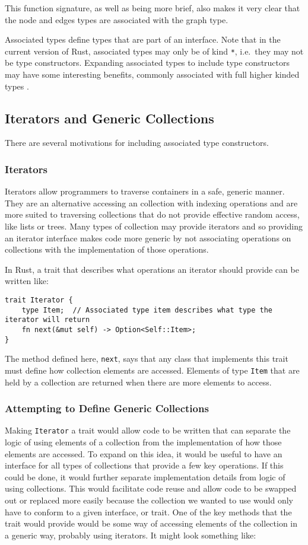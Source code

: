 This function signature, as well as being more brief, also makes it very clear
that the node and edges types are associated with the graph type. 

Associated types define types that are part of an interface. Note that in the
current version of Rust, associated types may only be of kind \lstinline{*},
i.e.\ they may not be type constructors. Expanding associated types to include
type constructors may have some interesting benefits, commonly associated with
full higher kinded types \cite{niko}.

\subsection{Iterators and Generic Collections}
There are several motivations for including associated type constructors.

\subsubsection{Iterators}
Iterators allow programmers to traverse containers in a safe, generic manner.
They are an alternative accessing an collection with indexing operations and
are more suited to traversing collections that do not provide effective random
access, like lists or trees. Many types of collection may provide iterators and
so providing an iterator interface makes code more generic by not associating
operations on collections with the implementation of those operations.

In Rust, a trait that describes what operations an iterator should provide can
be written like:

\begin{lstlisting}[nolol]
trait Iterator {
    type Item;  // Associated type item describes what type the iterator will return
    fn next(&mut self) -> Option<Self::Item>;
}
\end{lstlisting}

The method defined here, \lstinline{next}, says that any class that implements
this trait must define how collection elements are accessed. Elements of type
\lstinline{Item} that are held by a collection are returned when there are more
elements to access. 

\subsubsection{Attempting to Define Generic Collections}
Making \lstinline{Iterator} a trait would allow code to be written that can
separate the logic of using elements of a collection from the implementation of
how those elements are accessed. To expand on this idea, it would be useful to
have an interface for all types of collections that provide a few key
operations. If this could be done, it would further separate implementation
details from logic of using collections. This would facilitate code reuse and
allow code to be swapped out or replaced more easily because the collection we
wanted to use would only have to conform to a given interface, or trait.  One
of the key methods that the trait would provide would be some way of accessing
elements of the collection in a generic way, probably using iterators.  It
might look something like:

